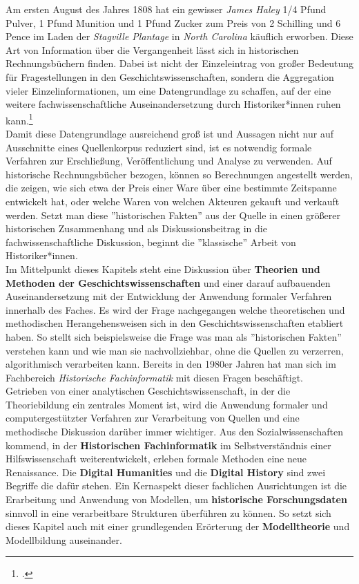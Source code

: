 \documentclass[12pt,a4paper]{article}
\begin{document}
Am ersten August des Jahres 1808 hat ein gewisser \textit{James Haley} 1/4 Pfund Pulver, 1 Pfund Munition und 1 Pfund Zucker zum Preis von 2 Schilling und 6 Pence im Laden der \textit{Stagville Plantage} in \textit{North Carolina} käuflich erworben. Diese Art von Information über die Vergangenheit lässt sich in historischen Rechnungsbüchern finden. Dabei ist nicht der Einzeleintrag von großer Bedeutung für Fragestellungen in den Geschichtswissenschaften, sondern die Aggregation vieler Einzelinformationen, um eine Datengrundlage zu schaffen, auf der eine weitere fachwissenschaftliche Auseinandersetzung durch Historiker*innen ruhen kann.\footcite[][06.06.2019]{vogeler2015mittelalterliche}
\\
Damit diese Datengrundlage ausreichend groß ist und Aussagen nicht nur auf Ausschnitte eines Quellenkorpus reduziert sind, ist es notwendig formale Verfahren zur Erschließung, Veröffentlichung und Analyse zu verwenden. Auf historische Rechnungsbücher bezogen, können so Berechnungen angestellt werden, die zeigen, wie sich etwa der Preis einer Ware über eine bestimmte Zeitspanne entwickelt hat, oder welche Waren von welchen Akteuren gekauft und verkauft werden.  Setzt man diese ''historischen Fakten'' aus der Quelle in einen größerer historischen Zusammenhang und als Diskussionsbeitrag in die fachwissenschaftliche Diskussion, beginnt die ''klassische'' Arbeit von Historiker*innen. 
\\
Im Mittelpunkt dieses Kapitels steht eine Diskussion über \textbf{Theorien und Methoden der Geschichtswissenschaften} und einer darauf aufbauenden Auseinandersetzung mit der Entwicklung der Anwendung formaler Verfahren innerhalb des Faches. Es wird der Frage nachgegangen welche theoretischen und methodischen Herangehensweisen sich in den Geschichtswissenschaften etabliert haben. So stellt sich beispielsweise die Frage was man als ''historischen Fakten'' verstehen kann und wie man sie nachvollziehbar, ohne die Quellen zu verzerren, algorithmisch verarbeiten kann. Bereits in den 1980er Jahren hat man sich im Fachbereich \textit{Historische Fachinformatik} mit diesen Fragen beschäftigt.
\\
Getrieben von einer analytischen Geschichtswissenschaft, in der die Theoriebildung ein zentrales Moment ist, wird die Anwendung formaler und computergestützter Verfahren zur Verarbeitung von Quellen und eine methodische Diskussion darüber immer wichtiger. Aus den Sozialwissenschaften kommend, in der \textbf{Historischen Fachinformatik} im Selbstverständnis einer Hilfswissenschaft weiterentwickelt, erleben formale Methoden eine neue Renaissance. Die \textbf{Digital Humanities} und die \textbf{Digital History} sind zwei Begriffe die dafür stehen. Ein Kernaspekt dieser fachlichen Ausrichtungen ist die Erarbeitung und Anwendung von Modellen, um \textbf{historische Forschungsdaten} sinnvoll in eine verarbeitbare Strukturen überführen zu können. So setzt sich dieses Kapitel auch mit einer grundlegenden Erörterung der \textbf{Modelltheorie} und Modellbildung auseinander.
\end{document}
